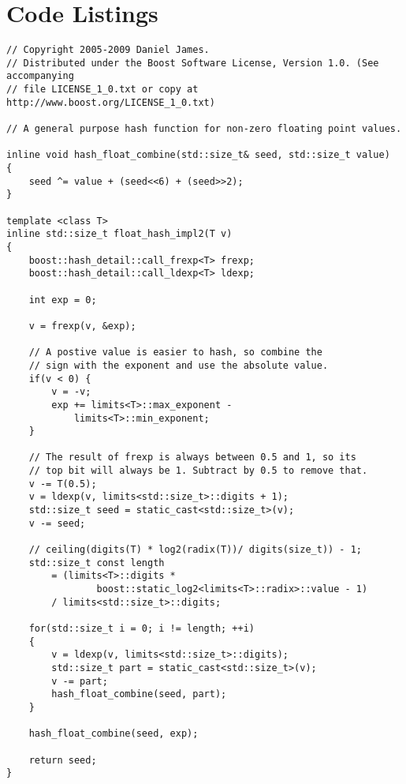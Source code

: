 \newpage

\section{Code Listings}

\begin{lstlisting}[label=lst:hash-float-function, caption=Code to Hash Single 32-bit Floating Point Value (Source code from file \texttt{boost/functional/hash/detail/hash\_float\_generic.hpp} in Boost Library 1.42.0)]
// Copyright 2005-2009 Daniel James.
// Distributed under the Boost Software License, Version 1.0. (See accompanying
// file LICENSE_1_0.txt or copy at http://www.boost.org/LICENSE_1_0.txt)

// A general purpose hash function for non-zero floating point values.

inline void hash_float_combine(std::size_t& seed, std::size_t value)
{
    seed ^= value + (seed<<6) + (seed>>2);
}

template <class T>
inline std::size_t float_hash_impl2(T v)
{
    boost::hash_detail::call_frexp<T> frexp;
    boost::hash_detail::call_ldexp<T> ldexp;

    int exp = 0;

    v = frexp(v, &exp);

    // A postive value is easier to hash, so combine the
    // sign with the exponent and use the absolute value.
    if(v < 0) {
        v = -v;
        exp += limits<T>::max_exponent -
            limits<T>::min_exponent;
    }

    // The result of frexp is always between 0.5 and 1, so its
    // top bit will always be 1. Subtract by 0.5 to remove that.
    v -= T(0.5);
    v = ldexp(v, limits<std::size_t>::digits + 1);
    std::size_t seed = static_cast<std::size_t>(v);
    v -= seed;

    // ceiling(digits(T) * log2(radix(T))/ digits(size_t)) - 1;
    std::size_t const length
        = (limits<T>::digits *
                boost::static_log2<limits<T>::radix>::value - 1)
        / limits<std::size_t>::digits;

    for(std::size_t i = 0; i != length; ++i)
    {
        v = ldexp(v, limits<std::size_t>::digits);
        std::size_t part = static_cast<std::size_t>(v);
        v -= part;
        hash_float_combine(seed, part);
    }

    hash_float_combine(seed, exp);

    return seed;
}
\end{lstlisting}